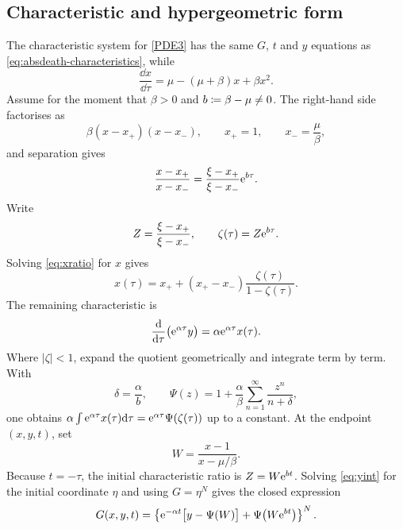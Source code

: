 \subsection{Characteristic and hypergeometric form}

The characteristic system for \eqref{PDE3} has the same \(G\), \(t\) and \(y\)
equations as \eqref{eq:absdeath-characteristics}, while
\begin{equation}
  \frac{\dd x}{\dd\tau}
  =\mu-(\mu+\beta)x+\beta x^2.
  \label{eq:abd-x-characteristic}
\end{equation}
Assume for the moment that \(\beta>0\) and
\(b\coloneqq\beta-\mu\neq0\).  The right-hand side factorises as
\begin{equation}
  \beta(x-x_+)(x-x_-),
  \qquad x_+=1,
  \qquad x_-=\frac{\mu}{\beta},
  \label{eq:abd-fixed-points}
\end{equation}
and separation gives
\begin{equation}
  \frac{x-x_+}{x-x_-}
  =\frac{\xi-x_+}{\xi-x_-}\mathrm{e}^{b\tau}.
  \label{eq:xratio}
\end{equation}
Write
\[
  Z=\frac{\xi-x_+}{\xi-x_-},
  \qquad
  \zeta(\tau)=Z\mathrm{e}^{b\tau}.
\]
Solving \eqref{eq:xratio} for \(x\) gives
\begin{equation}
  x(\tau)=x_++(x_+-x_-)
  \frac{\zeta(\tau)}{1-\zeta(\tau)}.
  \label{eq:xgeom}
\end{equation}
The remaining characteristic is
\begin{equation}
  \frac{\mathrm{d}}{\mathrm{d}\tau}\bigl(\mathrm{e}^{\alpha\tau}y\bigr)
  =\alpha\mathrm{e}^{\alpha\tau}x(\tau).
  \label{eq:yint}
\end{equation}
Where \(\lvert\zeta\rvert<1\), expand the quotient geometrically and integrate
term by term.  With
\begin{equation}
  \delta=\frac{\alpha}{b},
  \qquad
  \Psi(z)=1+\frac{\alpha}{\beta}
  \sum_{n=1}^{\infty}\frac{z^n}{n+\delta},
  \label{eq:Psidef}
\end{equation}
one obtains
\(
  \alpha\int\mathrm{e}^{\alpha\tau}x(\tau)\mathrm{d}\tau
  =\mathrm{e}^{\alpha\tau}\Psi(\zeta(\tau))
\)
up to a constant.  At the endpoint \((x,y,t)\), set
\begin{equation}
  W=\frac{x-1}{x-\mu/\beta}.
  \label{eq:Wdef}
\end{equation}
Because \(t=-\tau\), the initial characteristic ratio is
\(Z=W\mathrm{e}^{bt}\).  Solving \eqref{eq:yint} for the initial coordinate \(\eta\)
and using \(G=\eta^N\) gives the closed expression
\begin{equation}
  G(x,y,t)=
  \left\{
    \mathrm{e}^{-\alpha t}\bigl[y-\Psi(W)\bigr]
    +\Psi\bigl(W\mathrm{e}^{bt}\bigr)
  \right\}^{N}.
  \label{eq:Gabd}
\end{equation}

